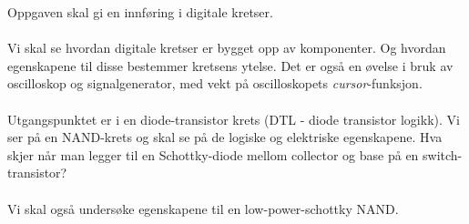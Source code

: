 Oppgaven skal gi en innføring i digitale kretser.
\\\\
Vi skal se hvordan digitale kretser er bygget opp av komponenter.
Og hvordan egenskapene til disse bestemmer kretsens ytelse.
Det er også en øvelse i bruk av oscilloskop og signalgenerator,
med vekt på oscilloskopets \emph{cursor}-funksjon.
\\\\
Utgangspunktet er i en diode-transistor krets (DTL - diode transistor logikk).
Vi ser på en NAND-krets og skal se på de logiske og elektriske egenskapene.
Hva skjer når man legger til en Schottky-diode mellom collector og base på
en switch-transistor?
\\\\
Vi skal også undersøke egenskapene til en low-power-schottky NAND.
